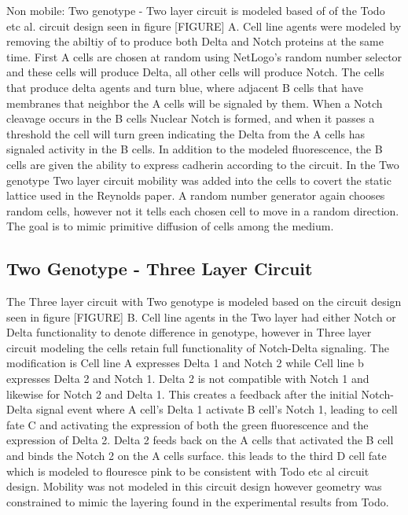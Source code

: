 Non mobile:
Two genotype - Two layer circuit is modeled based of of the Todo etc al. circuit design seen in figure [FIGURE] A. Cell line agents were modeled by removing the abiltiy of to produce both Delta and Notch proteins at the same time. First A cells are chosen at random using NetLogo's random number selector and these cells will produce Delta, all other cells will produce Notch. The cells that produce delta agents and turn blue, where adjacent B cells that have membranes that neighbor the A cells will be signaled by them. When a Notch cleavage occurs in the B cells Nuclear Notch is formed, and when it passes a threshold the cell will turn green indicating the Delta from the A cells has signaled activity in the B cells. In addition to the modeled fluorescence, the B cells are given the ability to express cadherin according to the circuit. In the Two genotype Two layer circuit mobility was added into the cells to covert the static lattice used in the Reynolds paper. A random number generator again chooses  random cells, however not it tells each chosen cell to move in a random direction. The goal is to mimic primitive diffusion of cells among the medium. 

\subsection{Two Genotype - Three Layer Circuit}

The Three layer circuit with Two genotype is modeled based on the circuit design seen in figure [FIGURE] B. Cell line agents in the Two layer had either Notch or Delta functionality to denote difference in genotype, however in Three layer circuit modeling the cells retain full functionality of Notch-Delta signaling. The modification is Cell line A expresses Delta 1 and Notch 2 while Cell line b expresses Delta 2 and Notch 1. Delta 2 is not compatible with Notch 1 and likewise for Notch 2 and Delta 1. This creates a feedback after the initial Notch-Delta signal event where A cell's Delta 1 activate B cell's Notch 1, leading to cell fate C and activating the expression of both the green fluorescence and the expression of Delta 2. Delta 2 feeds back on the A cells that activated the B cell and binds the Notch 2 on the A cells surface. this leads to the third D cell fate which is modeled to flouresce pink to be consistent with Todo etc al circuit design. Mobility was not modeled in this circuit design however geometry was constrained to mimic the layering found in the experimental results from Todo. 



